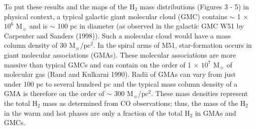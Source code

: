 \documentclass[manuscript]{aastex}
\begin{document}
To put these results and the maps of the $\mathrm{H_2}$ mass distributions (Figures 3 - 5) in physical context, a typical galactic giant molecular cloud (GMC) contains $\sim$ 1 $\times$ $\mathrm{10^6}$ $\mathrm{M_\sun}$ and is $\sim$ 100 pc in diameter (as observed in the galactic GMC W51 by Carpenter and Sanders (1998)).  Such a molecular cloud would have a mass column density of 30 $\mathrm{M_\sun}$/$\mathrm{pc^2}$.  In the spiral arms of M51, star-formation occurs in giant molecular associations (GMAs).  These molecular associations are more massive than typical GMCs and can contain on the order of 1 $\times$ $\mathrm{10^7}$ $\mathrm{M_\sun}$ of molecular gas (Rand and Kulkarni 1990).  Radii of GMAs can vary from just under 100 pc to several hundred pc and the typical mass column density of a GMA is therefore on the order of $\sim$ 300 $\mathrm{M_\sun}$/$\mathrm{pc^2}$.  These mass densities represent the total $\mathrm{H_2}$ mass as determined from CO observations; thus, the mass of the $\mathrm{H_2}$ in the warm and hot phases are only a fraction of the total $\mathrm{H_2}$ in GMAs and GMCs.
\end{document}
